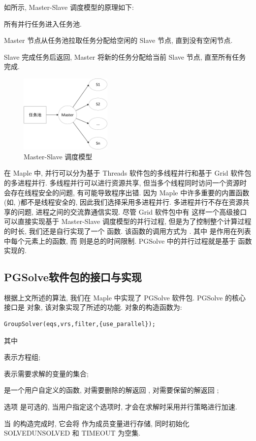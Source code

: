 如所示, Master-Slave 调度模型的原理如下:
\begin{compactenum}[Step 1.]
\item 所有并行任务进入任务池.
\item Master 节点从任务池拉取任务分配给空闲的 Slave 节点, 直到没有空闲节点.
\item Slave 完成任务后返回, Master 将新的任务分配给当前 Slave 节点, 直至所有任务完成. 
\end{compactenum}

\begin{figure}[htbp]
\centering 
\includegraphics[width=0.4\textwidth]{fig/msp.pdf}
\caption{Master-Slave 调度模型}\label{msp}
\end{figure}

在 Maple 中, 并行可以分为基于 Threads 软件包的多线程并行和基于 Grid 软件包的多进程并行. 多线程并行可以进行资源共享, 但当多个线程同时访问一个资源时会存在线程安全的问题, 有可能导致程序出错. 因为 Maple 中许多重要的内置函数(如, )都不是线程安全的, 因此我们选择采用多进程并行. 多进程并行不存在资源共享的问题, 进程之间的交流靠通信实现. 尽管 Grid 软件包中有  这样一个高级接口可以直接实现基于 Master-Slave 调度模型的并行过程, 但是为了控制整个计算过程的时长, 我们还是自行实现了一个  函数. 该函数的调用方式为 . 其中  是作用在列表  中每个元素上的函数, 而  则是总的时间限制. PGSolve 中的并行过程就是基于  函数实现的. 

\subsection{PGSolve软件包的接口与实现}
根据上文所述的算法, 我们在 Maple 中实现了 PGSolve 软件包. PGSolve 的核心接口是  对象, 该对象实现了所述的功能. 对象的构造函数为: 
\begin{verbatim}
GroupSolver(eqs,vrs,filter,{use_parallel});
\end{verbatim}
其中 
\begin{compactitem}[\textbullet]
\item {} 表示方程组;
\item {} 表示需要求解的变量的集合;
\item {} 是一个用户自定义的函数, 对需要删除的解返回 , 对需要保留的解返回 ;
\item 选项  是可选的, 当用户指定这个选项时,  才会在求解时采用并行策略进行加速.
\end{compactitem}
当  的构造完成时, 它会将  作为成员变量进行存储, 同时初始化 SOLVED\D UNSOLVED 和 TIMEOUT 为空集. 

